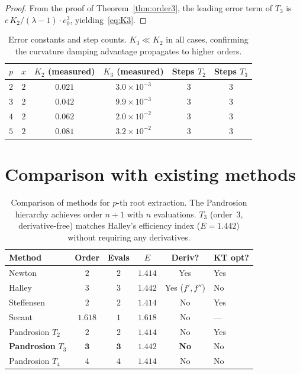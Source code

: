 \documentclass[11pt,a4paper]{article}
\theoremstyle{definition}
\begin{document}
\begin{proof}
From the proof of Theorem~\ref{thm:order3}, the leading error term of $T_3$ is $c\,K_2/(\lambda-1) \cdot e_0^3$, yielding~\eqref{eq:K3}.
\end{proof}

\begin{table}[H]
\centering
\begin{tabular}{cccccc}
\toprule
$p$ & $x$ & $K_2$ (measured) & $K_3$ (measured) & Steps $T_2$ & Steps $T_3$ \\
\midrule
$2$ & $2$ & $0.021$ & $3.0 \times 10^{-3}$ & $3$ & $3$ \\
$3$ & $2$ & $0.042$ & $9.9 \times 10^{-3}$ & $3$ & $3$ \\
$4$ & $2$ & $0.062$ & $2.0 \times 10^{-2}$ & $3$ & $3$ \\
$5$ & $2$ & $0.081$ & $3.2 \times 10^{-2}$ & $3$ & $3$ \\
\bottomrule
\end{tabular}
\caption{Error constants and step counts.  $K_3 \ll K_2$ in all cases, confirming the curvature damping advantage propagates to higher orders.}
\label{tab:K3}
\end{table}

\section{Comparison with existing methods}
\label{sec:comparison}

\begin{table}[H]
\centering
\renewcommand{\arraystretch}{1.2}
\begin{tabular}{lccccl}
\toprule
\textbf{Method} & \textbf{Order} & \textbf{Evals} & $E$ & \textbf{Deriv?} & \textbf{KT opt?} \\
\midrule
Newton & $2$ & $2$ & $1.414$ & Yes & Yes \\
Halley & $3$ & $3$ & $1.442$ & Yes ($f',f''$) & No \\
Steffensen & $2$ & $2$ & $1.414$ & No & Yes \\
Secant & $1.618$ & $1$ & $1.618$ & No & --- \\
\midrule
Pandrosion $T_2$ & $2$ & $2$ & $1.414$ & No & Yes \\
\textbf{Pandrosion} $T_3$ & $\mathbf{3}$ & $\mathbf{3}$ & $\mathbf{1.442}$ & \textbf{No} & No \\
Pandrosion $T_4$ & $4$ & $4$ & $1.414$ & No & No \\
\bottomrule
\end{tabular}
\caption{Comparison of methods for $p$-th root extraction.  The Pandrosion hierarchy achieves order $n+1$ with $n$ evaluations.  $T_3$ (order~$3$, derivative-free) matches Halley's efficiency index ($E = 1.442$) without requiring any derivatives.}
\label{tab:comparison}
\end{table}
\end{document}
